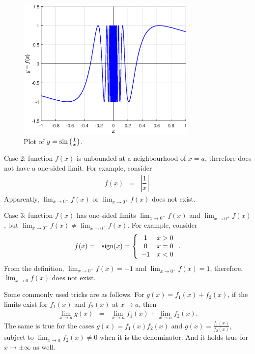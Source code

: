 \begin{figure}
\centering
\includegraphics[width=250pt]{chapters/part-1/figures/fig_sinoneoverx.eps}
\caption{Plot of $y=\textup{sin}\left(\frac{1}{x}\right)$.} \label{ch1fig:sinoneoverx}
\end{figure}

Case 2: function $f(x)$ is unbounded at a neighbourhood of $x=a$, therefore does not have a one-sided limit. For example, consider
\begin{eqnarray}
  f(x) &=& \left|\dfrac{1}{x}\right|. \nonumber
\end{eqnarray}
Apparently, $\lim_{x\rightarrow 0^-}f(x)$ or $\lim_{x\rightarrow 0^+}f(x)$ does not exist.

Case 3: function $f(x)$ has one-sided limits $\lim_{x\rightarrow 0^-}f(x)$ and $\lim_{x\rightarrow 0^+}f(x)$, but $\lim_{x\rightarrow 0^-}f(x) \neq \lim_{x\rightarrow 0^+}f(x)$. For example, consider
\begin{eqnarray}
  f(x) &=& \textup{sign}(x) = \left\{\begin{array}{cc}
                                    1 & x > 0 \\
                                    0 & x = 0 \\
                                    -1 & x < 0
                                  \end{array}\right..\nonumber
\end{eqnarray}
From the definition, $\lim_{x\rightarrow 0^-}f(x)=-1$ and $\lim_{x\rightarrow 0^+}f(x)=1$, therefore, $\lim_{x\rightarrow 0}f(x)$ does not exist.

Some commonly used tricks are as follows. For $g(x)=f_1(x) + f_2(x)$, if the limits exist for $f_1(x)$ and $f_2(x)$ at $x \rightarrow a$, then
\begin{eqnarray}
  \lim_{x \rightarrow a}g(x) &=& \lim_{x \rightarrow a}f_1(x) + \lim_{x \rightarrow a}f_2(x). \nonumber
\end{eqnarray}
The same is true for the cases $g(x)=f_1(x)f_2(x)$ and $g(x)=\frac{f_1(x)}{f_2(x)}$, subject to $\lim_{x \rightarrow a}f_2(x) \neq 0$ when it is the denominator. And it holds true for $x \rightarrow \pm \infty$ as well.

